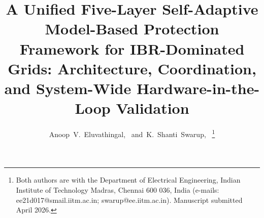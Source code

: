 \documentclass[journal,twoside]{IEEEtran}
\begin{document}
\title{A Unified Five-Layer Self-Adaptive Model-Based Protection Framework
  for IBR-Dominated Grids: Architecture, Coordination, and System-Wide
  Hardware-in-the-Loop Validation}

\author{Anoop~V.~Eluvathingal,~
        and~K.~Shanti~Swarup,~
\thanks{Both authors are with the Department of Electrical Engineering,
  Indian Institute of Technology Madras, Chennai 600 036, India
  (e-mails: ee21d017@smail.iitm.ac.in; swarup@ee.iitm.ac.in).
  Manuscript submitted April 2026.}}

\maketitle

\end{document}
